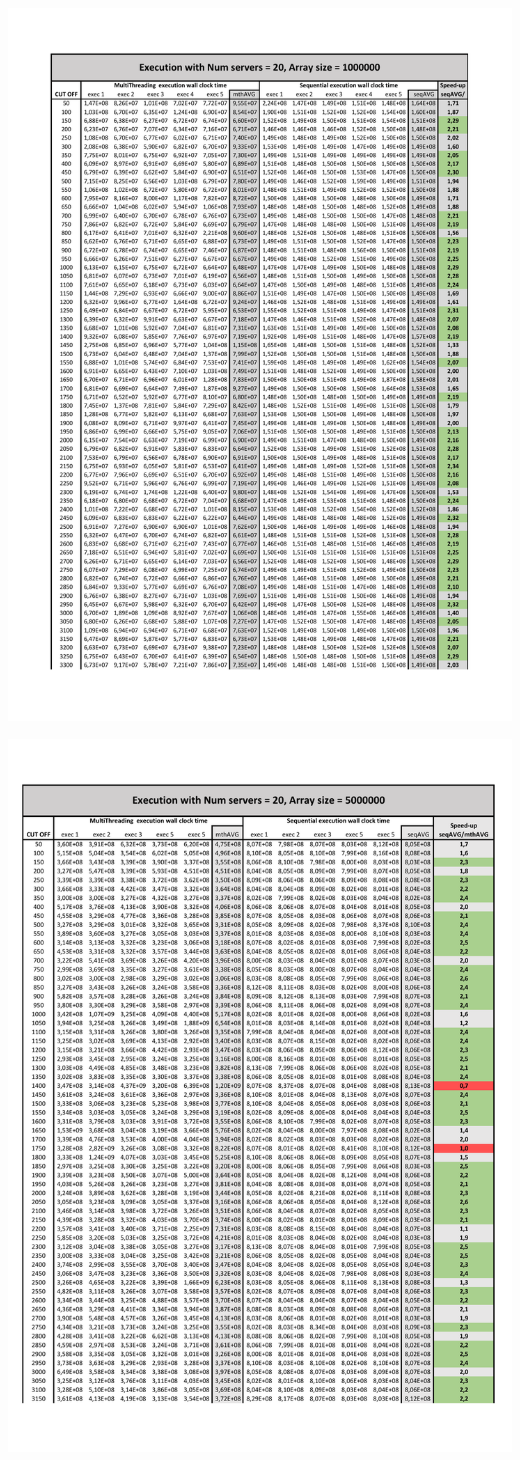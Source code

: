 \documentclass{article}
\begin{document}
\clearpage
\centering
\includegraphics[page=2, width=0.9\linewidth]{imgs/CutOffAnalysis01.pdf}
\endgroup

\begingroup
\centering
\includegraphics[page=1, width=0.9\linewidth]{imgs/CutOffAnalysis02.pdf}
\end{document}
